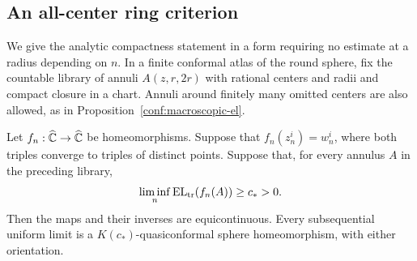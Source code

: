 \subsection{An all-center ring criterion}
\label{conf:analytic-subsection}

We give the analytic compactness statement in a form requiring no
estimate at a radius depending on \(n\).  In a finite conformal
atlas of the round sphere, fix the countable library of annuli
\(A(z,r,2r)\) with rational centers and radii and compact closure
in a chart.  Annuli around finitely many omitted centers are also
allowed, as in Proposition~\ref{conf:macroscopic-el}.

\begin{lemma}
\label{conf:ring-criterion}
Let \(f_n:\widehat{\mathbb C}\to\widehat{\mathbb C}\) be homeomorphisms.  Suppose that
\(f_n(z_n^i)=w_n^i\), where both triples converge to triples of
distinct points.  Suppose that, for every annulus \(A\) in the
preceding library,
\begin{equation}
 \liminf_n\EL_{\rm tr}(f_n(A))\ge c_*>0.
 \label{conf:ring-hypothesis}
\end{equation}
Then the maps and their inverses are equicontinuous.  Every
subsequential uniform limit is a \(K(c_*)\)-quasiconformal sphere
homeomorphism, with either orientation.
\end{lemma}

